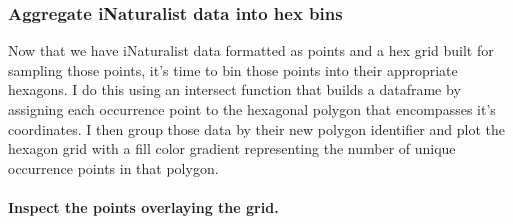 \documentclass[
]{article}
\newenvironment{Shaded}{\begin{snugshade}}{\end{snugshade}}
\newcommand{\CommentTok}[1]{\textcolor[rgb]{0.56,0.35,0.01}{\textit{#1}}}
\newcommand{\DataTypeTok}[1]{\textcolor[rgb]{0.13,0.29,0.53}{#1}}
\newcommand{\DecValTok}[1]{\textcolor[rgb]{0.00,0.00,0.81}{#1}}
\newcommand{\FloatTok}[1]{\textcolor[rgb]{0.00,0.00,0.81}{#1}}
\newcommand{\KeywordTok}[1]{\textcolor[rgb]{0.13,0.29,0.53}{\textbf{#1}}}
\newcommand{\NormalTok}[1]{#1}
\newcommand{\OperatorTok}[1]{\textcolor[rgb]{0.81,0.36,0.00}{\textbf{#1}}}
\newcommand{\OtherTok}[1]{\textcolor[rgb]{0.56,0.35,0.01}{#1}}
\newcommand{\StringTok}[1]{\textcolor[rgb]{0.31,0.60,0.02}{#1}}
\begin{document}
\begin{Shaded}
\end{Shaded}

\hypertarget{aggregate-inaturalist-data-into-hex-bins}{%
\subsubsection{Aggregate iNaturalist data into hex
bins}\label{aggregate-inaturalist-data-into-hex-bins}}

Now that we have iNaturalist data formatted as points and a hex grid
built for sampling those points, it's time to bin those points into
their appropriate hexagons. I do this using an intersect function that
builds a dataframe by assigning each occurrence point to the hexagonal
polygon that encompasses it's coordinates. I then group those data by
their new polygon identifier and plot the hexagon grid with a fill color
gradient representing the number of unique occurrence points in that
polygon.

\hypertarget{inspect-the-points-overlaying-the-grid.}{%
\paragraph{Inspect the points overlaying the
grid.}\label{inspect-the-points-overlaying-the-grid.}}

\begin{Shaded}
\end{Shaded}
\end{document}
